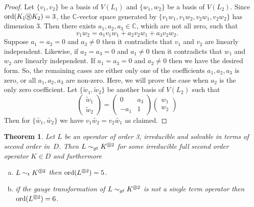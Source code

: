 \documentclass{article}
\newtheorem{theorem}{Theorem}[section]
\newcommand{\C}{{\mathbb{C}}} \newcommand{\N}{{\mathbb{N}}}
\newcommand{\ord}{\mathrm{ord}}
\newcommand{\cS}{\circledS}
\begin{document}
\begin{proof}
  Let $\{ v_1, v_2 \}$ be a basis of $V(L_1)$ and $\{ w_1, w_2 \}$ be a basis of $V(L_2)$.
  Since $\ord(K_1 \cS K_2)=3$, the $\C$-vector space generated by $\{ v_1w_1, v_1w_2,
  v_2w_1, v_2w_2 \}$ has dimension 3. Then there exists $a_1, a_2, a_3 \in \C$, which are
  not all zero, such that $$v_1w_2=a_1v_1w_1+a_2v_2w_1+a_3v_2w_2.$$ Suppose $a_1=a_2=0$
  and $a_3 \neq 0$ then it contradicts that $v_1$ and $v_2$ are linearly independent.
  Likewise, if $a_2= a_3=0$ and $a_1 \neq 0$ then it contradicts that $w_1$ and $w_2$ are
  linearly independent.  If $a_1=a_3=0$ and $a_2 \neq 0$ then we have the desired form.
  So, the remaining cases are either only one of the coefficients $a_1, a_2, a_3$ is zero,
  or all $a_1, a_2, a_3$ are non-zero.  Here, we will prove the case when $a_2$ is the
  only zero coefficient.  Let $\{\tilde{w}_1, \tilde{w}_2 \}$ be another basis of $V(L_2)$
  such that
$$
\begin{pmatrix}
\tilde{w}_1 \\
\tilde{w}_2
\end{pmatrix}
=
\begin{pmatrix}
0 & a_3 \\
-a_1 & 1
\end{pmatrix}
\begin{pmatrix}
w_1 \\
w_2
\end{pmatrix}
$$
Then for $\{\tilde{w_1},\tilde{w_2}\}$ we have $v_1\tilde{w_2}=v_2\tilde{w_1}$ as claimed.
\end{proof}






\begin{theorem}\label{thm:ord3dec}
  Let $L$ be an operator of order 3, irreducible and solvable in terms of second order in~$D$.
  Then $L \sim_{gt} K^{\circledS 2}$ for some irreducible full second order operator $K \in D$
  and furthermore
 

\begin{enumerate}[(a)]



\item\label{c1}  $L \sim_t K^{\cS 2}$ then $\ord(L^{\circledS 2})=5$.

 
\item\label{c2} if the gauge transformation of $L \sim_{gt} K^{\cS 2}$ is not a
  single term operator then $\ord(L^{\circledS 2})=6$.
\end{enumerate}

\end{theorem}
\end{document}
